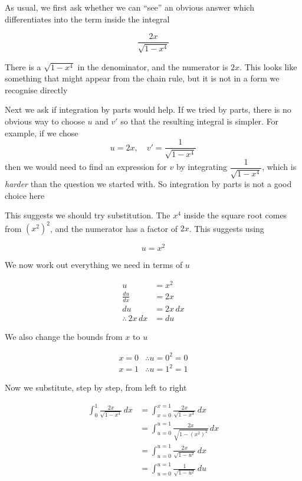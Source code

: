 \begin{solution}
    As usual, we first ask whether we can ``see'' an obvious answer which differentiates into the term inside the integral

    \[
        \frac{2x}{\sqrt{1 - x^4}}
    \]

    There is a $\sqrt{1 - x^4}$ in the denominator, and the numerator is $2x$. This looks like something that might appear from the chain rule, but it is not in a form we recognise directly

    Next we ask if integration by parts would help. If we tried by parts, there is no obvious way to choose $u$ and $v'$ so that the resulting integral is simpler. For example, if we chose
    \[
        u = 2x, \quad v' = \frac{1}{\sqrt{1 - x^4}}
    \]
    then we would need to find an expression for $v$ by integrating $\dfrac{1}{\sqrt{1 - x^4}}$, which is \emph{harder} than the question we started with. So integration by parts is not a good choice here

    This suggests we should try substitution. The $x^4$ inside the square root comes from $(x^2)^2$, and the numerator has a factor of $2x$. This suggests using

    \[
        u = x^2
    \]

    We now work out everything we need in terms of $u$

    \begin{align*}
        u &= x^2 \\
        \frac{du}{dx} &= 2x \tag{differentiating} \\
        du &= 2x \, dx \\
        \therefore \ 2x \, dx &= du
    \end{align*}

    We also change the bounds from $x$ to $u$

    \begin{align*}
        x = 0 &\therefore u = 0^2 = 0 \\
        x = 1 &\therefore u = 1^2 = 1
    \end{align*}

    Now we substitute, step by step, from left to right

    \begin{align*}
        \int_{0}^{1} \frac{2x}{\sqrt{1 - x^4}} \, dx 
        &= \int_{x=0}^{x=1} \frac{2x}{\sqrt{1 - x^4}} \, dx \\
        &= \int_{u=0}^{u=1} \frac{2x}{\sqrt{1 - (x^2)^2}} \, dx \tag{using $u = x^2$} \\
        &= \int_{u=0}^{u=1} \frac{2x}{\sqrt{1 - u^2}} \, dx \tag{substituting $x^2 = u$ inside the square root} \\
        &= \int_{u=0}^{u=1} \frac{1}{\sqrt{1 - u^2}} \, du \tag{using $2x \, dx = du$}
    \end{align*}


\end{solution}
